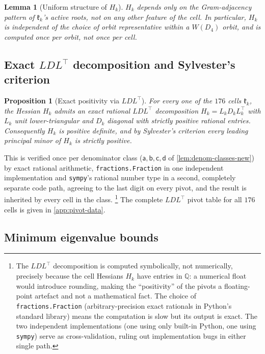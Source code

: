 \documentclass[11pt,reqno]{amsart}
\renewcommand{\_}{\origunderscore\allowbreak}
\numberwithin{equation}{section}
\theoremstyle{plain}
\newtheorem{prop}[thm]{Proposition}
\newtheorem{lem}[thm]{Lemma}
\theoremstyle{definition}
\theoremstyle{remark}
\newcommand{\Cell}[1]{\mathfrak{k}_{#1}}     %
\begin{document}
\begin{lem}[Uniform structure of $H_k$]\label{lem:hessian-structure-new}
$H_k$ depends only on the Gram-adjacency pattern of $\Cell{k}$'s active
roots, not on any other feature of the cell. In particular, $H_k$ is
independent of the choice of orbit representative within a $W(D_4)$
orbit, and is computed once per orbit, not once per cell.
\end{lem}

\subsection{Exact $LDL^\top$ decomposition and Sylvester's criterion}

\begin{prop}[Exact positivity via $LDL^\top$]\label{prop:ldlt-new}
For every one of the $176$ cells $\Cell{k}$, the Hessian $H_k$ admits an
exact rational $LDL^\top$ decomposition $H_k=L_kD_kL_k^\top$ with $L_k$
unit lower-triangular and $D_k$ diagonal with strictly positive
rational entries. Consequently $H_k$ is positive definite, and by
Sylvester's criterion every leading principal minor of $H_k$ is
strictly positive.
\end{prop}

This is verified once per denominator class ($\mathsf a,\mathsf b,
\mathsf c,\mathsf d$ of \cref{lem:denom-classes-new}) by exact rational
arithmetic, \texttt{fractions.Fraction} in one independent
implementation and \texttt{sympy}'s rational number type in a second,
completely separate code path, agreeing to the last digit on every
pivot, and the result is inherited by every cell in the class.%
\footnote{The $LDL^\top$ decomposition is computed symbolically, not
  numerically, precisely because the cell Hessians $H_k$ have entries in
  $\mathbb{Q}$: a numerical float would introduce rounding, making the
  ``positivity'' of the pivots a floating-point artefact and not a mathematical fact.  The choice of \texttt{fractions.Fraction} (arbitrary-precision
  exact rationals in Python's standard library) means the computation is
  slow but its output is exact.  The two independent implementations
  (one using only built-in Python, one using \texttt{sympy}) serve as
  cross-validation, ruling out implementation bugs in either single path.}
The complete $LDL^\top$ pivot table for all $176$ cells is given in
\cref{app:pivot-data}.

\subsection{Minimum eigenvalue bounds}
\end{document}
